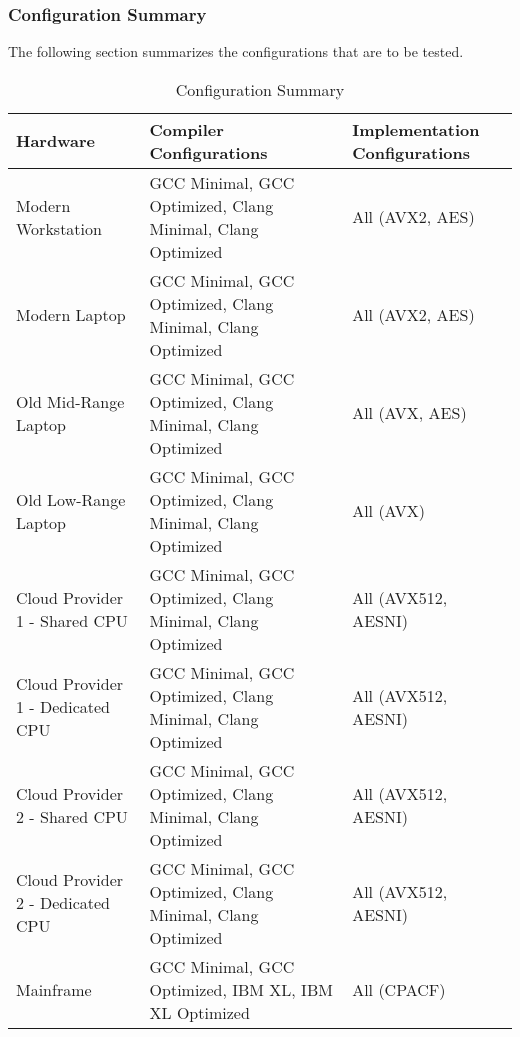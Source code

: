 \subsubsection{Configuration Summary}

The following section summarizes the configurations that are to be tested.

\begin{table}[]
    \centering
    \begin{tabular}{l|p{4cm}|p{3cm}}
        Hardware & Compiler Configurations & Implementation Configurations\\
        \hline
        Modern Workstation & GCC Minimal, GCC Optimized, Clang Minimal, Clang Optimized & All (AVX2, AES)\\
        Modern Laptop & GCC Minimal, GCC Optimized, Clang Minimal, Clang Optimized & All (AVX2, AES) \\
        Old Mid-Range Laptop & GCC Minimal, GCC Optimized, Clang Minimal, Clang Optimized & All (AVX, AES)\\
        Old Low-Range Laptop & GCC Minimal, GCC Optimized, Clang Minimal, Clang Optimized & All (AVX)\\
        Cloud Provider 1 - Shared CPU & GCC Minimal, GCC Optimized, Clang Minimal, Clang Optimized & All (AVX512, AESNI)\\
        Cloud Provider 1 - Dedicated CPU & GCC Minimal, GCC Optimized, Clang Minimal, Clang Optimized & All (AVX512, AESNI)\\
        Cloud Provider 2 - Shared CPU & GCC Minimal, GCC Optimized, Clang Minimal, Clang Optimized & All (AVX512, AESNI)\\
        Cloud Provider 2 - Dedicated CPU & GCC Minimal, GCC Optimized, Clang Minimal, Clang Optimized & All (AVX512, AESNI)\\
        Mainframe & GCC Minimal, GCC Optimized, IBM XL, IBM XL Optimized & All (CPACF)\\
    \end{tabular}
    \caption{Configuration Summary}
    \label{table:method:configuration-summary}
\end{table}